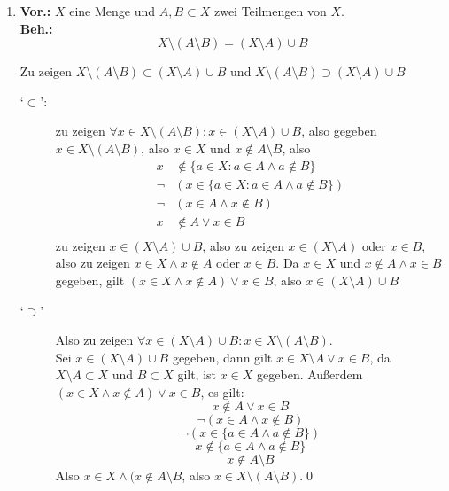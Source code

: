 \documentclass{gadsescript}
\begin{document}
\begin{enumerate}[label=\alph*)]
\begin{proof*}
		\end{proof*}
	\item \textbf{Vor.:} $ X $ eine Menge und $ A, B \subset X $ zwei Teilmengen von $ X $.\\
		\textbf{Beh.:}
		\[ X \setminus ( A \setminus B ) = ( X \setminus A ) \cup B \]
		\begin{proof*}
			Zu zeigen $ X \setminus ( A \setminus B ) \subset ( X \setminus A ) \cup B $ und $ X \setminus ( A \setminus B ) \supset ( X \setminus A ) \cup B $
			\begin{description}
				\item[`$\subset$':] zu zeigen $ \forall x \in X \setminus ( A \setminus B ) : x \in ( X\setminus A) \cup B $, also gegeben $ x \in X \setminus ( A \setminus B ) $, also $ x \in X $ und $ x \notin A \setminus B $, also
					\begin{align*}
						x &\notin \{ a \in X : a \in A \wedge a \notin B \}\\
						\neg &\left( x \in \{ a \in X : a \in A \wedge a \notin B \} \right)\\
						\neg &\left( x \in A \wedge x \notin B \right)\\
						x &\notin A \vee x \in B \\
					\end{align*}
					zu zeigen $ x \in ( X \setminus A ) \cup B $, also zu zeigen $ x \in ( X \setminus A ) $ oder $ x \in B $, also zu zeigen $ x \in X \wedge x \notin A $ oder $ x \in B $. Da $ x \in X $ und $ x \notin A \wedge x \in B $ gegeben, gilt $ ( x \in X \wedge x \notin A ) \vee x \in B $, also $ x \in (X\setminus A) \cup B$
				\item[`$\supset$'] Also zu zeigen $ \forall x \in ( X \setminus A ) \cup B: x \in X \setminus ( A \setminus B )$.\\
					Sei $ x \in ( X \setminus A ) \cup B $ gegeben,
					dann gilt $ x \in X \setminus A \vee x \in B $,
					da $ X \setminus A \subset X $ und $ B \subset X $ gilt, ist $ x \in X $ gegeben.
					Außerdem $ ( x \in X \wedge x \notin A ) \vee x \in B $, es gilt:
					\[ x \notin A \vee x \in B \]
					\[ \neg \left ( x \in A \wedge x \notin B \right) \]
					\[ \neg \left ( x \in \{a \in A \wedge a \notin B \} \right) \]
					\[  x \notin \{a \in A \wedge a \notin B \} \]
					\[ x \notin A \setminus B \]
					Also $ x \in X \wedge ( x \notin A\setminus B $, also $ x \in X \setminus ( A \setminus B ) $.\qed
			\end{description}
		\end{proof*}
\end{enumerate}
\end{document}
